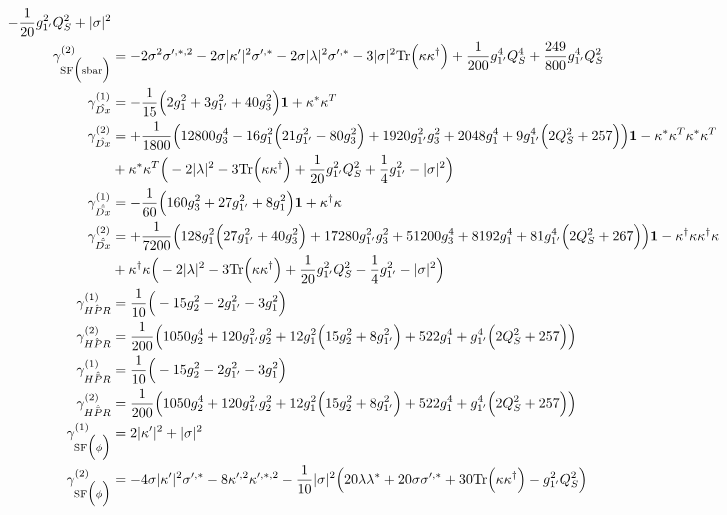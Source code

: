 {\begin{align}
-\frac{1}{20} g_{1'}^{2} Q_{S}^{2}  + |\sigma|^2\\ 
\gamma_{\text{SF}\Big(\text{sbar}\Big)}^{(2)} & =  
-2 \sigma^{2} \sigma^{\prime,*,2}  -2 \sigma |\kappa^\prime|^2 \sigma^{\prime,*}  -2 \sigma |\lambda|^2 \sigma^{\prime,*}  -3 |\sigma|^2 \mbox{Tr}\Big({\kappa  \kappa^{\dagger}}\Big)  + \frac{1}{200} g_{1'}^{4} Q_{S}^{4}  + \frac{249}{800} g_{1'}^{4} Q_{S}^{2} \\ 
\gamma_{\hat{Dx}}^{(1)} & =  
-\frac{1}{15} \Big(2 g_{1}^{2}  + 3 g_{1'}^{2}  + 40 g_{3}^{2} \Big){\bf 1}  + {\kappa^*  \kappa^{T}}\\ 
\gamma_{\hat{Dx}}^{(2)} & =  
+\frac{1}{1800} \Big(12800 g_{3}^{4}  -16 g_{1}^{2} \Big(21 g_{1'}^{2}  -80 g_{3}^{2} \Big) + 1920 g_{1'}^{2} g_{3}^{2}  + 2048 g_{1}^{4}  + 9 g_{1'}^{4} \Big(2 Q_{S}^{2}  + 257\Big)\Big){\bf 1} - {\kappa^*  \kappa^{T}  \kappa^*  \kappa^{T}} \nonumber \\ 
 &+{\kappa^*  \kappa^{T}} \Big(-2 |\lambda|^2  -3 \mbox{Tr}\Big({\kappa  \kappa^{\dagger}}\Big)  + \frac{1}{20} g_{1'}^{2} Q_{S}^{2}  + \frac{1}{4} g_{1'}^{2}  - |\sigma|^2 \Big)\\ 
\gamma_{\hat{\bar{Dx}}}^{(1)} & =  
-\frac{1}{60} \Big(160 g_{3}^{2}  + 27 g_{1'}^{2}  + 8 g_{1}^{2} \Big){\bf 1}  + {\kappa^{\dagger}  \kappa}\\ 
\gamma_{\hat{\bar{Dx}}}^{(2)} & =  
+\frac{1}{7200} \Big(128 g_{1}^{2} \Big(27 g_{1'}^{2}  + 40 g_{3}^{2} \Big) + 17280 g_{1'}^{2} g_{3}^{2}  + 51200 g_{3}^{4}  + 8192 g_{1}^{4}  + 81 g_{1'}^{4} \Big(2 Q_{S}^{2}  + 267\Big)\Big){\bf 1} - {\kappa^{\dagger}  \kappa  \kappa^{\dagger}  \kappa} \nonumber \\ 
 &+{\kappa^{\dagger}  \kappa} \Big(-2 |\lambda|^2  -3 \mbox{Tr}\Big({\kappa  \kappa^{\dagger}}\Big)  + \frac{1}{20} g_{1'}^{2} Q_{S}^{2}  -\frac{1}{4} g_{1'}^{2}  - |\sigma|^2 \Big)\\ 
\gamma_{\hat{HPR}}^{(1)} & =  
\frac{1}{10} \Big(-15 g_{2}^{2}  -2 g_{1'}^{2}  -3 g_{1}^{2} \Big)\\ 
\gamma_{\hat{HPR}}^{(2)} & =  
\frac{1}{200} \Big(1050 g_{2}^{4}  + 120 g_{1'}^{2} g_{2}^{2}  + 12 g_{1}^{2} \Big(15 g_{2}^{2}  + 8 g_{1'}^{2} \Big) + 522 g_{1}^{4}  + g_{1'}^{4} \Big(2 Q_{S}^{2}  + 257\Big)\Big)\\ 
\gamma_{\hat{\bar{HPR}}}^{(1)} & =  
\frac{1}{10} \Big(-15 g_{2}^{2}  -2 g_{1'}^{2}  -3 g_{1}^{2} \Big)\\ 
\gamma_{\hat{\bar{HPR}}}^{(2)} & =  
\frac{1}{200} \Big(1050 g_{2}^{4}  + 120 g_{1'}^{2} g_{2}^{2}  + 12 g_{1}^{2} \Big(15 g_{2}^{2}  + 8 g_{1'}^{2} \Big) + 522 g_{1}^{4}  + g_{1'}^{4} \Big(2 Q_{S}^{2}  + 257\Big)\Big)\\ 
\gamma_{\text{SF}\Big(\phi \Big)}^{(1)} & =  
2 |\kappa^\prime|^2  + |\sigma|^2\\ 
\gamma_{\text{SF}\Big(\phi \Big)}^{(2)} & =  
-4 \sigma |\kappa^\prime|^2 \sigma^{\prime,*}  -8 \kappa^{\prime,2} \kappa^{\prime,*,2}  -\frac{1}{10} |\sigma|^2 \Big(20 \lambda \lambda^*  + 20 \sigma \sigma^{\prime,*}  + 30 \mbox{Tr}\Big({\kappa  \kappa^{\dagger}}\Big)  - g_{1'}^{2} Q_{S}^{2} \Big)
\end{align} } 
